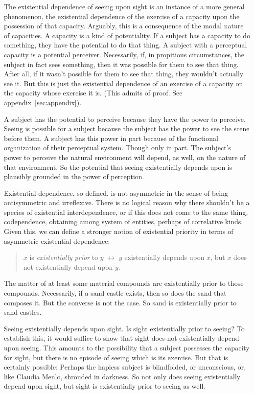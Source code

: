 \documentclass[12pt]{article}
\begin{document}
The existential dependence of seeing upon sight is an instance of a more general phenomenon, the existential dependence of the exercise of a capacity upon the possession of that capacity. Arguably, this is a consequence of the modal nature of capacities. A capacity is a kind of potentiality. If a subject has a capacity to do something, they have the potential to do that thing. A subject with a perceptual capacity is a potential perceiver. Necessarily, if, in propitious circumstances, the subject in fact sees something, then it was possible for them to see that thing. After all, if it wasn't possible for them to see that thing, they wouldn't actually see it. But this is just the existential dependence of an exercise of a capacity on the capacity whose exercise it is. (This admits of proof. See appendix~\ref{sec:appendix}).

A subject has the potential to perceive because they have the power to perceive. Seeing is possible for a subject because the subject has the power to see the scene before them. A subject has this power in part because of the functional organization of their perceptual system. Though only in part. The subject's power to perceive the natural environment will depend, as well, on the nature of that environment. So the potential that seeing existentially depends upon is plausibly grounded in the power of perception.

Existential dependence, so defined, is not asymmetric in the sense of being antisymmetric and irreflexive. There is no logical reason why there shouldn't be a species of existential interdependence, or if this does not come to the same thing, codependence, obtaining among system of entities, perhaps of correlative kinds. Given this, we can define a stronger notion of existential priority in terms of asymmetric existential dependence:
\begin{quote}
    \( x \) is \emph{existentially prior} to \( y \) \( \leftrightarrow \) \( y \) existentially depends upon \( x \), but \( x \) does not existentially depend upon \( y \).
\end{quote}
The matter of at least some material compounds are existentially prior to those compounds. Necessarily, if a sand castle exists, then so does the sand that composes it. But the converse is not the case. So sand is existentially prior to sand castles.

Seeing existentially depends upon sight. Is sight existentially prior to seeing? To establish this, it would suffice to show that sight does not existentially depend upon seeing. This amounts to the possibility that a subject possesses the capacity for sight, but there is no episode of seeing which is its exercise. But that is certainly possible: Perhaps the hapless subject is blindfolded, or unconscious, or, like Claudia Menlo, shrouded in darkness. So not only does seeing existentially depend upon sight, but sight is existentially prior to seeing as well.
\end{document}
